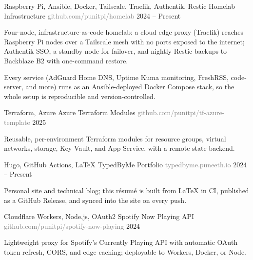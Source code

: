 \documentclass[11pt, a4paper]{awesome-cv}
\begin{document}
\begin{cventries}

  \cventry
    {Raspberry Pi, Ansible, Docker, Tailscale, Traefik, Authentik, Restic}
    {Homelab Infrastructure \textnormal{\textcolor{graytext}{\small github.com/punitpi/homelab}}}
    {}
    {2024 -- Present}
    {
      \begin{cvitems}
        \item {Four-node, infrastructure-as-code homelab: a cloud edge proxy (Traefik) reaches Raspberry Pi nodes over a Tailscale mesh with no ports exposed to the internet; Authentik SSO, a standby node for failover, and nightly Restic backups to Backblaze B2 with one-command restore.}
        \item {Every service (AdGuard Home DNS, Uptime Kuma monitoring, FreshRSS, code-server, and more) runs as an Ansible-deployed Docker Compose stack, so the whole setup is reproducible and version-controlled.}
      \end{cvitems}
    }

  \cventry
    {Terraform, Azure}
    {Azure Terraform Modules \textnormal{\textcolor{graytext}{\small github.com/punitpi/tf-azure-template}}}
    {}
    {2025}
    {
      \begin{cvitems}
        \item {Reusable, per-environment Terraform modules for resource groups, virtual networks, storage, Key Vault, and App Service, with a remote state backend.}
      \end{cvitems}
    }

  \cventry
    {Hugo, GitHub Actions, LaTeX}
    {TypedByMe Portfolio \textnormal{\textcolor{graytext}{\small typedbyme.puneeth.io}}}
    {}
    {2024 -- Present}
    {
      \begin{cvitems}
        \item {Personal site and technical blog; this résumé is built from LaTeX in CI, published as a GitHub Release, and synced into the site on every push.}
      \end{cvitems}
    }

  \cventry
    {Cloudflare Workers, Node.js, OAuth2}
    {Spotify Now Playing API \textnormal{\textcolor{graytext}{\small github.com/punitpi/spotify-now-playing}}}
    {}
    {2024}
    {
      \begin{cvitems}
        \item {Lightweight proxy for Spotify's Currently Playing API with automatic OAuth token refresh, CORS, and edge caching; deployable to Workers, Docker, or Node.}
      \end{cvitems}
    }

\end{cventries}
\end{document}
